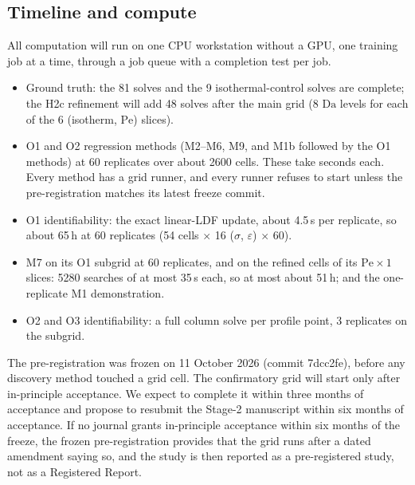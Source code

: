 \documentclass[11pt]{article}
\newcommand{\Da}{\mathrm{Da}}
\newcommand{\Pe}{\mathrm{Pe}}
\begin{document}
\subsection{Timeline and compute}
\label{sec:compute}
All computation will run on one CPU workstation without a GPU, one training job at a time,
through a job queue with a completion test per job.
\begin{itemize}
\item Ground truth: the 81 solves and the 9 isothermal-control solves are complete; the
H2c refinement will add 48 solves after the main grid (8 $\Da$ levels for each of the 6
(isotherm, $\Pe$) slices).
\item O1 and O2 regression methods (M2--M6, M9, and M1b followed by the O1 methods) at 60
replicates over about 2600 cells. These take seconds each. Every method has a grid runner,
and every runner refuses to start unless the pre-registration matches its latest freeze
commit.
\item O1 identifiability: the exact linear-LDF update, about 4.5\,s per replicate, so about
65\,h at 60 replicates (54 cells $\times$ 16 ($\sigma$, $\varepsilon$) $\times$ 60).
\item M7 on its O1 subgrid at 60 replicates, and on the refined cells of its $\Pe\times1$
slices: 5280 searches of at most 35\,s each, so at most about 51\,h; and the one-replicate M1
demonstration.
\item O2 and O3 identifiability: a full column solve per profile point, 3 replicates on
the subgrid.
\end{itemize}
The pre-registration was frozen on 11 October 2026 (commit 7dcc2fe), before any
discovery method touched a grid cell. The confirmatory grid will start only after
in-principle acceptance. We expect to complete it within three months of acceptance and
propose to resubmit the Stage-2 manuscript within six months of acceptance. If no journal
grants in-principle acceptance within six months of the freeze, the frozen
pre-registration provides that the grid runs after a dated amendment saying so, and the
study is then reported as a pre-registered study, not as a Registered Report.
\end{document}
